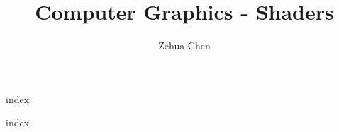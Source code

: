 \documentclass[letterpaper, 11pt]{report}
\title{Computer Graphics - Shaders}
\author{Zehua Chen}
\begin{document}
  \maketitle
  \tableofcontents

  {index}

  \newpage
  \appendix
  {index}
\end{document}
